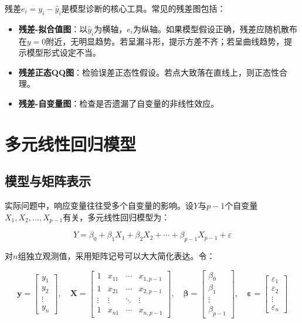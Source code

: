 \documentclass[
]{book}
\providecommand{\tightlist}{%
  \setlength{\itemsep}{0pt}\setlength{\parskip}{0pt}}
\begin{document}
残差\(e_i = y_i - \hat{y}_i\)是模型诊断的核心工具。常见的残差图包括：

\begin{itemize}
\tightlist
\item
  \textbf{残差-拟合值图}：以\(\hat{y}_i\)为横轴，\(e_i\)为纵轴。如果模型假设正确，残差应随机散布在\(y=0\)附近，无明显趋势。若呈漏斗形，提示方差不齐；若呈曲线趋势，提示模型形式设定不当。
\item
  \textbf{残差正态QQ图}：检验误差正态性假设。若点大致落在直线上，则正态性合理。
\item
  \textbf{残差-自变量图}：检查是否遗漏了自变量的非线性效应。
\end{itemize}

\section{多元线性回归模型}\label{ux591aux5143ux7ebfux6027ux56deux5f52ux6a21ux578b}

\subsection{模型与矩阵表示}\label{ux6a21ux578bux4e0eux77e9ux9635ux8868ux793a}

实际问题中，响应变量往往受多个自变量的影响。设\(Y\)与\(p-1\)个自变量\(X_1, X_2, \ldots, X_{p-1}\)有关，多元线性回归模型为：

\[
Y = \beta_0 + \beta_1 X_1 + \beta_2 X_2 + \cdots + \beta_{p-1} X_{p-1} + \varepsilon
\]

对\(n\)组独立观测值，采用矩阵记号可以大大简化表达。令：

\[
\mathbf{y} = \begin{bmatrix} y_1 \\ y_2 \\ \vdots \\ y_n \end{bmatrix}, \quad
\mathbf{X} = \begin{bmatrix}
1 & x_{11} & \cdots & x_{1,p-1} \\
1 & x_{21} & \cdots & x_{2,p-1} \\
\vdots & \vdots & \ddots & \vdots \\
1 & x_{n1} & \cdots & x_{n,p-1}
\end{bmatrix}, \quad
\boldsymbol{\beta} = \begin{bmatrix} \beta_0 \\ \beta_1 \\ \vdots \\ \beta_{p-1} \end{bmatrix}, \quad
\boldsymbol{\varepsilon} = \begin{bmatrix} \varepsilon_1 \\ \varepsilon_2 \\ \vdots \\ \varepsilon_n \end{bmatrix}
\]
\end{document}
